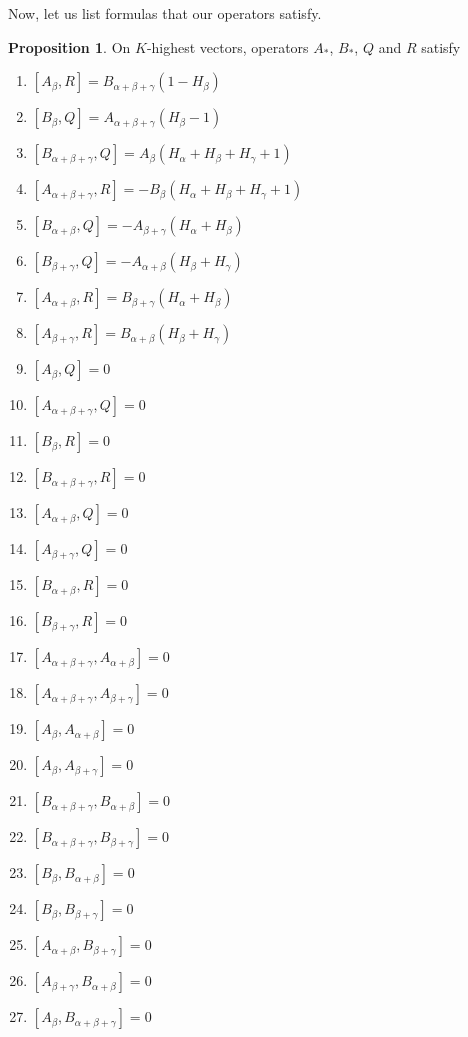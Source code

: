 \documentclass[twoside,a4paper,12pt]{article}
\theoremstyle{definition}
\newtheorem{proposition}{Proposition}
\begin{document}
Now, let us list formulas that our operators satisfy.

\begin{proposition}\label{commabqr}
	On $K$-highest vectors, operators $A_*$, $B_*$, $Q$ and $R$ satisfy
	\begin{enumerate}
		\item $[A_\beta,R]=B_{\alpha+\beta+\gamma}(1-H_\beta)$
		\item $[B_\beta,Q]=A_{\alpha+\beta+\gamma}(H_\beta-1)$
		\item $[B_{\alpha+\beta+\gamma},Q]=A_\beta(H_\alpha+H_\beta+H_\gamma+1)$
		\item $[A_{\alpha+\beta+\gamma},R]=
			-B_\beta(H_\alpha+H_\beta+H_\gamma+1)$
		\item $[B_{\alpha+\beta},Q]=-A_{\beta+\gamma}(H_\alpha+H_\beta)$
		\item $[B_{\beta+\gamma},Q]=-A_{\alpha+\beta}(H_\beta+H_\gamma)$
		\item $[A_{\alpha+\beta},R]=B_{\beta+\gamma}(H_\alpha+H_\beta)$
		\item $[A_{\beta+\gamma},R]=B_{\alpha+\beta}(H_\beta+H_\gamma)$
		\item $[A_\beta,Q]=0$
		\item $[A_{\alpha+\beta+\gamma},Q]=0$
		\item $[B_\beta,R]=0$
		\item $[B_{\alpha+\beta+\gamma},R]=0$
		\item $[A_{\alpha+\beta},Q]=0$
		\item $[A_{\beta+\gamma},Q]=0$
		\item $[B_{\alpha+\beta},R]=0$
		\item $[B_{\beta+\gamma},R]=0$
		\item $[A_{\alpha+\beta+\gamma},A_{\alpha+\beta}]=0$
		\item $[A_{\alpha+\beta+\gamma},A_{\beta+\gamma}]=0$
		\item $[A_\beta,A_{\alpha+\beta}]=0$
		\item $[A_\beta,A_{\beta+\gamma}]=0$
		\item $[B_{\alpha+\beta+\gamma},B_{\alpha+\beta}]=0$
		\item $[B_{\alpha+\beta+\gamma},B_{\beta+\gamma}]=0$
		\item $[B_\beta,B_{\alpha+\beta}]=0$
		\item $[B_\beta,B_{\beta+\gamma}]=0$
		\item $[A_{\alpha+\beta},B_{\beta+\gamma}]=0$
		\item $[A_{\beta+\gamma},B_{\alpha+\beta}]=0$
		\item $[A_\beta,B_{\alpha+\beta+\gamma}]=0$
	\end{enumerate}
\end{proposition}
\end{document}
